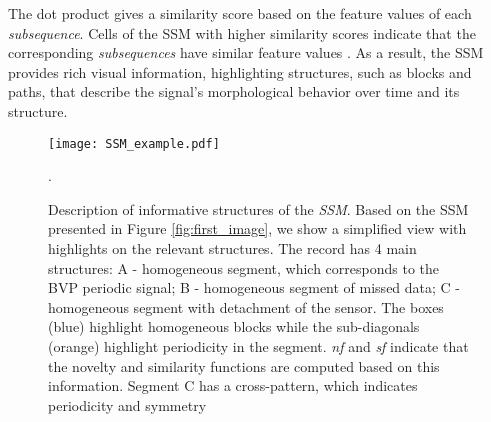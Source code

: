 The dot product gives a similarity score based on the feature values of each \textit{subsequence}. Cells of the \gls{SSM} with higher similarity scores indicate that the corresponding \textit{subsequences} have similar feature values \cite{audiolabs1, audiolabs2}. As a result, the \gls{SSM} provides rich visual information, highlighting structures, such as blocks and paths, that describe the signal's morphological behavior over time and its structure.
\par

\begin{figure}
    \centering
    \texttt{[image: SSM\_example.pdf]}
    \caption{Description of informative structures of the \textit{SSM}. Based on the \gls{SSM} presented in Figure \ref{fig:first_image}, we show a simplified view with highlights on the relevant structures. The record has 4 main structures: A - homogeneous segment, which corresponds to the BVP periodic signal; B - homogeneous segment of missed data; C - homogeneous segment with detachment of the sensor. The boxes (blue) highlight homogeneous blocks while the sub-diagonals (orange) highlight periodicity in the segment. \textit{nf} and \textit{sf} indicate that the novelty and similarity functions are computed based on this information. Segment C has a cross-pattern, which indicates periodicity and symmetry}. 
    \label{fig:ssm_description}
\end{figure}

